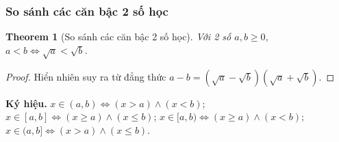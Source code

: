 \documentclass{article}
\numberwithin{equation}{section}
\newtheorem{theorem}{Theorem}[section]
\begin{document}
\subsubsection{So sánh các căn bậc 2 số học}
\begin{theorem}[So sánh các căn bậc 2 số học]
	Với 2 số $a,b\ge 0$, $a < b\Leftrightarrow\sqrt{a} < \sqrt{b}$.
\end{theorem}

\begin{proof}
	Hiển nhiên suy ra từ đẳng thức $a - b = (\sqrt{a} - \sqrt{b})(\sqrt{a} + \sqrt{b})$.
\end{proof}
\textbf{Ký hiệu.} $x\in(a,b)\Leftrightarrow(x > a)\land(x < b)$; $x\in[a,b]\Leftrightarrow(x\ge a)\land(x\le b)$; $x\in[a,b)\Leftrightarrow(x\ge a)\land(x < b)$; $x\in(a,b]\Leftrightarrow(x > a)\land(x\le b)$.
\end{document}

